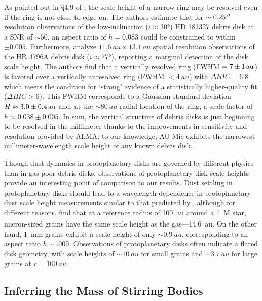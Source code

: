 \documentclass[modern]{aastex62}
\begin{document}
As pointed out in \S 4.9 of \citet{marino16}, the scale height of a narrow ring may be resolved even if the ring is not close to edge-on.
The authors estimate that for $\sim \SI{0.25}{\mbox{$^{\prime\prime}$}}$ resolution observations of the low-inclination ($i \approx \ang{30}$) HD 181327 debris disk at a SNR of $\sim 50$, an aspect ratio of $h=0.083$ could be constrained to within $\pm 0.005$. 
Furthermore, \citet{kennedy18} analyze $\SI{11.6}{au} \times \SI{13.1}{au}$ spatial resolution observations of the HR 4796A debris disk ($i \approx \ang{77}$), reporting a marginal detection of the disk scale height.
The authors find that a vertically resolved ring (FWHM $= \SI{7 \pm 1}{au}$) is favored over a vertically unresolved ring (FWHM $< \SI{4}{au}$) with $\Delta BIC = 6.8$ which meets the condition for `strong' evidence of a statistically higher-quality fit ($\Delta BIC > 6$). 
This FWHM corresponds to a Gaussian standard deviation $H \approx \SI{3.0 \pm 0.4}{au}$ and, at the $\sim \SI{80}{au}$ radial location of the ring, a scale factor of $h \approx 0.038 \pm 0.005$.
In sum, the vertical structure of debris disks is just beginning to be resolved in the millimeter thanks to the improvements in sensitivity and resolution provided by ALMA; to our knowledge, AU Mic exhibits the narrowest millimeter-wavelength scale height of any known debris disk.


Though dust dynamics in protoplanetary disks are governed by different physics than in gas-poor debris disks, observations of protoplanetary disk scale heights provide an interesting point of comparison to our results.
Dust settling in protoplanetary disks should lead to a wavelength-dependence in protoplanetary dust scale height measurements similar to that predicted by \citet{thebault09}, although for different reasons.
\citet{boehler13} find that at a reference radius of \SI{100}{au} around a \SI{1}{M_\sun} star, micron-sized grains have the same scale height as the gas---\SI{14.6}{au}.
On the other hand, \SI{1}{mm} grains exhibit a scale height of only $\sim \SI{0.9}{au}$, corresponding to an aspect ratio $h \sim .009$.
Observations of protoplanetary disks often indicate a flared disk geometry, with scale heights of $\sim \SI{10}{au}$ for small grains and $\sim \SI{3.7}{au}$ for large grains at $r=\SI{100}{au}$.


\subsection{Inferring the Mass of Stirring Bodies}
\label{inferring mass}
\end{document}
